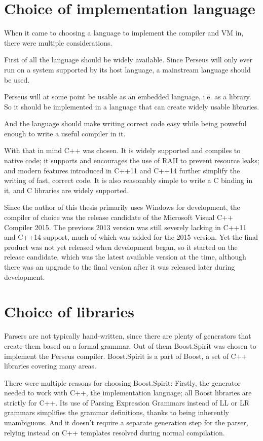 	\section{Choice of implementation language}
	
		When it came to choosing a language to implement the compiler and VM in, there were multiple considerations.
		
		First of all the language should be widely available. Since Perseus will only ever run on a system supported by its host language, a mainstream language should be used.
		
		Perseus will at some point be usable as an embedded language, i.e. as a library. So it should be implemented in a language that can create widely usable libraries.
		
		And the language should make writing correct code easy while being powerful enough to write a useful compiler in it.
		
		With that in mind C++ was chosen. It is widely supported and compiles to native code; it supports and encourages the use of RAII to prevent resource leaks; and modern features introduced in C++11 and C++14 further simplify the writing of fast, correct code. It is also reasonably simple to write a C binding in it, and C libraries are widely supported.
		
		Since the author of this thesis primarily uses Windows for development, the compiler of choice was the release candidate of the Microsoft Visual C++ Compiler 2015. The previous 2013 version was still severely lacking in C++11 and C++14 support, much of which was added for the 2015 version. Yet the final product was not yet released when development began, so it started on the release candidate, which was the latest available version at the time, although there was an upgrade to the final version after it was released later during development.
	
	\section{Choice of libraries}
	
		Parsers are not typically hand-written, since there are plenty of generators that create them based on a formal grammar. Out of them Boost.Spirit was chosen to implement the Perseus compiler. Boost.Spirit is a part of Boost, a set of C++ libraries covering many areas.
		
		There were multiple reasons for choosing Boost.Spirit: Firstly, the generator needed to work with C++, the implementation language; all Boost libraries are strictly for C++. Its use of Parsing Expression Grammars instead of LL or LR grammars simplifies the grammar definitions, thanks to being inherently unambiguous. And it doesn't require a separate generation step for the parser, relying instead on C++ templates resolved during normal compilation.
		
